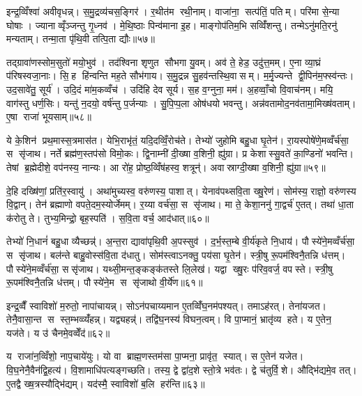 इन्द्र॒व्विँश्वा॑ अवीवृधन्न्। स॒मु॒द्रव्य॑चस॒ङ्गिर॑। र॒थीत॑म रथी॒नाम्। वाजा॑ना॒ सत्प॑तिं॒ पतिम्। परि॑मा से॒न्या घोषाः। ज्यानाव्वृँञ्जन्तु गृ॒ध्नव॑। मे॒थि॒ष्ठाः पिन्व॑माना इ॒ह। माङ्गोप॑तिम॒भि सव्विँ॑शन्तु। तन्मेऽनु॑मति॒रनु॑ मन्यताम्। तन्मा॒ता पृ॑थि॒वी तत्पि॒ता द्यौः॥५७॥

तद्ग्रावा॑णस्सोम॒सुतो॑ मयो॒भुव॑। तद॑श्विना शृणुत सौभगा यु॒वम्। अव॑ ते॒ हेड॒ उदु॑त्त॒मम्। ए॒ना व्या॒घ्रं प॑रिषस्वजा॒नाः। सि॒ह हि॑न्वन्ति मह॒ते सौभ॑गाय। स॒मु॒द्रन्न सु॒हव॑न्तस्थि॒वासम्। म॒र्मृ॒ज्यन्ते द्वी॒पिन॑म॒फ्स्व॑न्तः। उद॒सावे॑तु॒ सूर्य॑। उदि॒दं मा॑म॒कव्वँच॑। उदि॑हि देव सूर्य। स॒ह व॒ग्नुना॒ मम॑। अ॒हव्वाँ॒चो वि॒वाच॑नम्। मयि॒ वाग॑स्तु धर्ण॒सिः। यन्तु॑ न॒दयो॒ वर्\mbox{}ष॑न्तु प॒र्जन्याः। सु॒पि॒प्प॒ला ओष॑धयो भवन्तु। अन्न॑वतामोद॒नव॑तामा॒मिख्ष॑वताम्। ए॒षा राजा॑ भूयसाम्॥५८॥\anuvakamend[स्व॒धायै त्वा स॒वेन॒ द्यौस्सूर्य स॒प्त च॑]

ये के॒शिन॑ प्रथ॒मास्स॒त्रमास॑त। येभि॒राभृ॑तं॒ यदि॒दव्विँ॒रोच॑ते। तेभ्यो॑ जुहोमि बहु॒धा घृ॒तेन॑। रा॒यस्पोषे॑णे॒मव्वँर्च॑सा॒ स सृ॑जाथ। नर्ते ब्रह्म॑ण॒स्तप॑सो विमो॒कः। द्वि॒नाम्नी॑ दी॒ख्षा व॒शिनी॒ ह्यु॑ग्रा। प्र केशास्सु॒वते॑ का॒ण्डिनो॑ भवन्ति। तेषां ब्र॒ह्मेदीशे॒ वप॑नस्य॒ नान्यः। आ रो॑ह॒ प्रोष्ठ॒व्विँष॑हस्व॒ शत्रून्॑। अवास्राग्दी॒ख्षा व॒शिनी॒ ह्यु॑ग्रा॥५९॥

दे॒हि दख्षि॑णां॒ प्रति॑र॒स्वायु॑। अथा॑मुच्यस्व॒ वरु॑णस्य॒ पाशात्। येनाव॑पथ्सवि॒ता ख्षु॒रेण॑। सोम॑स्य॒ राज्ञो॒ वरु॑णस्य वि॒द्वान्। तेन॑ ब्रह्माणो वपते॒दम॒स्योर्जेमम्। र॒य्या वर्च॑सा॒ स सृ॑जाथ। मा ते॒ केशा॒ननु॑ गा॒द्वर्च॑ ए॒तत्। तथा॑ धा॒ता क॑रोतु ते। तुभ्य॒मिन्द्रो॒ बृह॒स्पति॑। स॒वि॒ता वर्च॒ आद॑धात्॥६०॥

तेभ्यो॑ नि॒धानं॑ बहु॒धा व्यैच्छन्न्॑। अ॒न्त॒रा द्यावा॑पृथि॒वी अ॒पस्सुव॑। द॒र्भ॒स्त॒म्बे वी॒र्य॑कृते नि॒धाय॑। पौस्ये॑ने॒मव्वँर्च॑सा॒ स सृ॑जाथ। बल॑न्ते बाहु॒वोस्स॑वि॒ता द॑धातु। सोम॑स्त्वाऽनक्तु॒ पय॑सा घृ॒तेन॑। स्त्री॒षु रू॒पम॑श्विनै॒तन्नि ध॑त्तम्। पौस्ये॑ने॒मव्वँर्च॑सा॒ ससृ॑जाथ। यथ्सी॒मन्त॒ङ्कङ्क॑तस्ते लि॒लेख॑। यद्वा ख्षु॒रः प॑रिव॒वर्ज॒ वपस्ते। स्त्री॒षु रू॒पम॑श्विनै॒तन्नि ध॑त्तम्। पौस्ये॑ने॒म स सृ॑जाथो वी॒र्ये॑ण॥६१॥\anuvakamend[अवास्राग्दी॒ख्षा व॒शिनी॒ ह्यु॑ग्राऽद॑धाद्व॒वर्ज॒ वप स्ते॒ द्वे च॑]

इन्द्र॒व्वैँ स्वाविशो॑ म॒रुतो॒ नापा॑चायन्न्। सोऽन॑पचाय्यमान ए॒तव्विँ॑घ॒नम॑पश्यत्। तमाऽह॑रत्। तेना॑यजत। तेनै॒वासा॒न्त स स्त॒म्भव्व्यँ॑हन्न्। यद्व्यहन्न्॑। तद्वि॑घ॒नस्य॑ विघन॒त्वम्। वि पा॒प्मानं॒ भ्रातृ॑व्य हते। य ए॒तेन॒ यज॑ते। य उ॑ चैनमे॒वव्वेँद॑॥६२॥

य राजा॑न॒व्विँशो॒ नाप॒चाये॑युः। यो वा ब्राह्म॒णस्तम॑सा पा॒प्मना॒ प्रावृ॑त॒ स्यात्। स ए॒तेन॑ यजेत। वि॒घ॒नेनै॒वैन॑द्वि॒हत्य॑। वि॒शामाधि॑पत्यङ्गच्छति। तस्य॒ द्वे द्वा॑द॒शे स्तो॒त्रे भव॑तः। द्वे च॑तुर्वि॒शे। औद्भि॑द्यमे॒व तत्। ए॒तद्वै ख्ष॒त्रस्यौद्भि॑द्यम्। यद॑स्मै॒ स्वाविशो॑ ब॒लि हर॑न्ति॥६३॥

